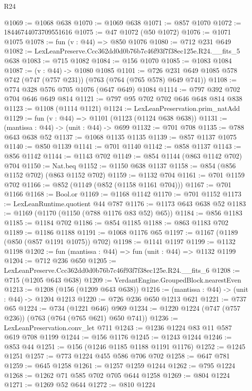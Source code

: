 \begin{lexlean}{R24}
\begin{coremodule}
@1069 := @1068 @638
@1070 := @1069 @638
@1071 := @857 @1070
@1072 := 18446744073709551616
@1075 := @47 @1072 (@50 @1072)
@1076 := @1071 @1075
@1078 := fun (v : @44) => @850 @1076
@1080 := @712 @231 @649
@1082 := LexLeanPreserve.Ccc362dd0d0b76b7c46f93f7f38ec125e.R24.__fits_5 @638
@1083 := @715 @1082
@1084 := @156 @1070
@1085 := @1083 @1084
@1087 := (v : @44) -> @1080 @1085
@1101 := @726 @231 @649 @1085 @578 @742 (@747 (@757 @231)) (@763 (@764 (@765 @578) @649 @741))
@1108 := @774 @328 @576 @705 @1076 (@647 @649) @1084
@1114 := @797 @392 @702 @704 @646 @649 @814
@1121 := @797 @95 @702 @702 @646 @648 @814 @838
@1123 := @1108 (@1114 @1121)
@1124 := LexLeanPreservation.prim_natAdd
@1129 := fun (v : @44) => @1101 (@1123 (@1124 @638 @638))
@1131 := (mantissa : @44) -> (unit : @44) -> @699
@1132 := @701 @708
@1135 := @788 @643 @638 @52
@1137 := @1068 @1135 @1135
@1139 := @857 @1137 @1075
@1140 := @850 @1139
@1141 := @701 @1140
@1142 := @858 @1137
@1143 := @856 @1142
@1144 := @1143 @702
@1149 := @854 @1144 (@863 @1142 @702) @704
@1150 := Nat.beq
@1152 := @1150 @638 @1137
@1158 := @854 (@856 @1152 @702) (@863 @1152 @702)
@1159 := @1132 @704
@1161 := @701 @1159 @702
@1166 := @852 (@1149 (@852 (@1158 @1161 @704)))
@1167 := @701 @1166
@1168 := Bool.or
@1169 := @1168 @1142
@1170 := @701 @1152
@1173 := LexLeanRuntime.quotient @44 @787
@1176 := @1173 @643 @638 @52
@1183 := @1169 (@1170 (@1150 (@788 @1176 @83 @52) @65))
@1184 := @856 @1183
@1185 := @1184 @702
@1186 := @854 @1185
@1188 := @863 @1183 @702
@1189 := @1186 @1188
@1191 := @1068 @1176 @65
@1197 := @1167 (@1189 (@850 (@857 @1191 @1075)) @702)
@1198 := @1141 @1197
@1199 := @1132 @1198
@1202 := fun (mantissa : @44) => fun (unit : @44) => @1132 @1199
@1204 := @712 @236 @650
@1205 := LexLeanPreserve.Ccc362dd0d0b76b7c46f93f7f38ec125e.R24.__fits_6
@1208 := @715 (@1205 @643 @638)
@1209 := VerdantEngine.GroupedBlock.nearestEven
@1213 := @1208 (@156 (@1209 @643 @638))
@1216 := (mantissa : @44) -> (unit : @44) -> @1204 @1213
@1220 := @726 @236 @650 @1213 @621
@1221 := @737 @65
@1224 := @734 (@1221 @646) @969
@1234 := @1220 @1224 (@747 (@757 @236)) (@763 (@764 (@765 @621) @650 @741))
@1236 := LexLeanPreservation.conv_let @711
@1243 := @1236 @1224 @83 @11 @587 @619 @708 @1199
@1244 := @156 @1176
@1245 := @1243 @1244
@1246 := @853 @44
@1251 := @156 (@1246 @1185 @1188 @1191 @1176)
@1252 := @1245 @1251
@1257 := @773 @1224 @455 @586 @706 @702
@1258 := @647 @781
@1259 := @645 @1258
@1261 := @1257 @1259 @1244
@1262 := @795 @1224
@1268 := @1262 @71 @585 @702 @705 @644 @1258
@1269 := @804 @1224
@1271 := @1269 @52 @644
@1272 := @810 @1224

\end{coremodule}
\end{lexlean}
